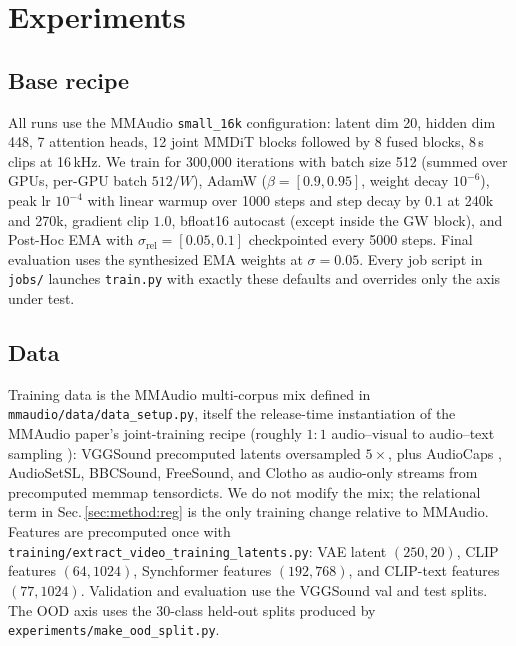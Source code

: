 \section{Experiments}
\label{sec:experiments}

\subsection{Base recipe}
All runs use the MMAudio \texttt{small\_16k} configuration:
latent dim 20, hidden dim 448, 7 attention heads, 12 joint
MMDiT blocks followed by 8 fused blocks, 8\,s clips at 16\,kHz.
We train for 300{,}000 iterations with batch size 512 (summed
over GPUs, per-GPU batch $512 / W$), AdamW ($\beta =
[0.9, 0.95]$, weight decay $10^{-6}$), peak lr $10^{-4}$ with
linear warmup over 1000 steps and step decay by $0.1$ at
240k and 270k, gradient clip $1.0$, bfloat16 autocast (except
inside the GW block), and Post-Hoc EMA \citep{cheng2024mmaudio}
with $\sigma_{\text{rel}} = [0.05, 0.1]$ checkpointed every 5000
steps. Final evaluation uses the synthesized EMA weights at
$\sigma = 0.05$. Every job script in \texttt{jobs/} launches
\texttt{train.py} with exactly these defaults and overrides only
the axis under test.

\subsection{Data}
Training data is the MMAudio multi-corpus mix defined in
\texttt{mmaudio/data/data\_setup.py}, itself the release-time
instantiation of the MMAudio paper's joint-training recipe
(roughly $1{:}1$ audio--visual to audio--text sampling
\citep{cheng2024mmaudio}): VGGSound \citep{chen2024vggsound}
precomputed latents oversampled $5\times$, plus AudioCaps
\citep{kim2019audiocaps}, AudioSetSL, BBCSound, FreeSound, and
Clotho as audio-only streams from precomputed memmap
tensordicts. We do not modify the mix; the relational term in
Sec.\,\ref{sec:method:reg} is the only training change relative
to MMAudio. Features are
precomputed once with
\texttt{training/extract\_video\_training\_latents.py}: VAE
latent $(250, 20)$, CLIP features $(64, 1024)$, Synchformer
features $(192, 768)$, and CLIP-text features $(77, 1024)$.
Validation and evaluation use the VGGSound val and test splits.
The OOD axis uses the 30-class held-out splits produced by
\texttt{experiments/make\_ood\_split.py}.

